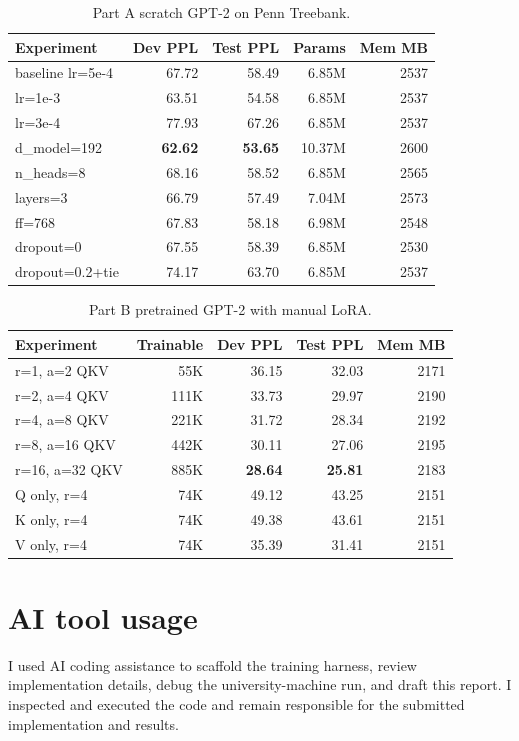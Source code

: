 \documentclass[a4paper]{article}
\begin{document}
\begin{table}[t]
\centering
\small
\caption{Part A scratch GPT-2 on Penn Treebank.}
\label{tab:lm-core}
\begin{tabular}{lrrrr}
\hline
Experiment & Dev PPL & Test PPL & Params & Mem MB \\
\hline
baseline lr=5e-4 & 67.72 & 58.49 & 6.85M & 2537 \\
lr=1e-3 & 63.51 & 54.58 & 6.85M & 2537 \\
lr=3e-4 & 77.93 & 67.26 & 6.85M & 2537 \\
d\_model=192 & \textbf{62.62} & \textbf{53.65} & 10.37M & 2600 \\
n\_heads=8 & 68.16 & 58.52 & 6.85M & 2565 \\
layers=3 & 66.79 & 57.49 & 7.04M & 2573 \\
ff=768 & 67.83 & 58.18 & 6.98M & 2548 \\
dropout=0 & 67.55 & 58.39 & 6.85M & 2530 \\
dropout=0.2+tie & 74.17 & 63.70 & 6.85M & 2537 \\
\hline
\end{tabular}
\end{table}

\begin{table}[t]
\centering
\small
\caption{Part B pretrained GPT-2 with manual LoRA.}
\label{tab:lm-lora}
\begin{tabular}{lrrrr}
\hline
Experiment & Trainable & Dev PPL & Test PPL & Mem MB \\
\hline
r=1, a=2 QKV & 55K & 36.15 & 32.03 & 2171 \\
r=2, a=4 QKV & 111K & 33.73 & 29.97 & 2190 \\
r=4, a=8 QKV & 221K & 31.72 & 28.34 & 2192 \\
r=8, a=16 QKV & 442K & 30.11 & 27.06 & 2195 \\
r=16, a=32 QKV & 885K & \textbf{28.64} & \textbf{25.81} & 2183 \\
Q only, r=4 & 74K & 49.12 & 43.25 & 2151 \\
K only, r=4 & 74K & 49.38 & 43.61 & 2151 \\
V only, r=4 & 74K & 35.39 & 31.41 & 2151 \\
\hline
\end{tabular}
\end{table}

\section*{AI tool usage}
I used AI coding assistance to scaffold the training harness, review implementation details, debug the university-machine run, and draft this report. I inspected and executed the code and remain responsible for the submitted implementation and results.



\end{document}
